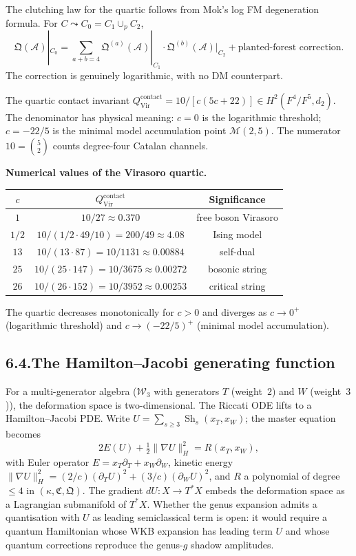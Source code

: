 \documentclass[11pt,reqno]{amsart}
\theoremstyle{definition}
\theoremstyle{remark}
\providecommand{\cA}{\mathcal{A}}
\providecommand{\Vir}{\mathrm{Vir}}
\numberwithin{equation}{section}
\begin{document}
The clutching law for the quartic follows from Mok's log FM
degeneration formula. For $C\leadsto C_0=C_1\cup_p C_2$,
\[
\mathfrak Q(\cA)|_{C_0}=\sum_{a+b=4}\mathfrak Q^{(a)}(\cA)|_{C_1}\cdot\mathfrak Q^{(b)}(\cA)|_{C_2}+\text{planted-forest correction}.
\]
The correction is genuinely logarithmic, with no DM counterpart.

The quartic contact invariant
$Q^{\mathrm{contact}}_{\mathrm{Vir}}=10/[c(5c+22)]\in H^2(F^4/F^5,d_2)$.
The denominator has physical meaning: $c=0$ is the logarithmic
threshold; $c=-22/5$ is the minimal model accumulation point
$\mathcal M(2,5)$. The numerator $10=\binom{5}{2}$ counts degree-four
Catalan channels.

\medskip
\noindent\textbf{Numerical values of the Virasoro quartic.}\enspace
\begin{center}
\renewcommand{\arraystretch}{1.1}
\begin{tabular}{ccc}
$c$ & $Q^{\mathrm{contact}}_{\Vir}$ & \textbf{Significance}\\
\hline
$1$ & $10/27\approx 0.370$ & free boson Virasoro\\
$1/2$ & $10/(1/2\cdot 49/10)=200/49\approx 4.08$ & Ising model\\
$13$ & $10/(13\cdot 87)=10/1131\approx 0.00884$ & self-dual\\
$25$ & $10/(25\cdot 147)=10/3675\approx 0.00272$ & bosonic string\\
$26$ & $10/(26\cdot 152)=10/3952\approx 0.00253$ & critical string
\end{tabular}
\end{center}
The quartic decreases monotonically for $c>0$ and diverges as $c\to 0^+$
(logarithmic threshold) and $c\to(-22/5)^+$ (minimal model accumulation).

\subsection*{6.4.\enspace The Hamilton--Jacobi generating function}

For a multi-generator algebra ($\mathcal W_3$ with generators $T$
(weight~$2$) and $W$ (weight~$3$)), the deformation space is
two-dimensional. The Riccati ODE lifts to a Hamilton--Jacobi PDE.
Write $U=\sum_{s\ge 3}\operatorname{Sh}_s(x_T,x_W)$; the master equation
becomes
\[
2E(U)+\tfrac12\lVert\nabla U\rVert^2_H=R(x_T,x_W),
\]
with Euler operator $E=x_T\partial_T+x_W\partial_W$, kinetic energy
$\lVert\nabla U\rVert^2_H=(2/c)(\partial_T U)^2+(3/c)(\partial_W U)^2$,
and $R$ a polynomial of degree $\le 4$ in
$(\kappa,\mathfrak C,\mathfrak Q)$. The gradient $dU\colon X\to T^*X$
embeds the deformation space as a Lagrangian submanifold of $T^*X$.
Whether the genus expansion admits a quantisation with $U$ as leading
semiclassical term is open: it would require a quantum Hamiltonian
whose WKB expansion has leading term $U$ and whose quantum corrections
reproduce the genus-$g$ shadow amplitudes.
\end{document}
